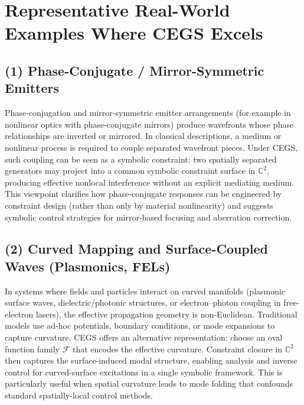 \documentclass[11pt]{article}
\theoremstyle{plain}
\theoremstyle{definition}
\theoremstyle{remark}
\begin{document}
\section*{Representative Real-World Examples Where CEGS Excels}

\subsection*{(1) Phase-Conjugate / Mirror-Symmetric Emitters}
Phase-conjugation and mirror-symmetric emitter arrangements (for example in nonlinear
optics with phase-conjugate mirrors) produce wavefronts whose phase relationships
are inverted or mirrored. In classical descriptions, a medium or nonlinear process
is required to couple separated wavefront pieces. Under CEGS, such coupling can be
seen as a symbolic constraint: two spatially separated generators may project into a
common symbolic constraint surface in \(\mathbb{C}^2\), producing effective
nonlocal interference without an explicit mediating medium. This viewpoint
clarifies how phase-conjugate responses can be engineered by constraint design
(rather than only by material nonlinearity) and suggests symbolic control strategies
for mirror-based focusing and aberration correction.

\subsection*{(2) Curved Mapping and Surface-Coupled Waves (Plasmonics, FELs)}
In systems where fields and particles interact on curved manifolds (plasmonic surface
waves, dielectric/photonic structures, or electron–photon coupling in free-electron
lasers), the effective propagation geometry is non-Euclidean. Traditional models use
ad-hoc potentials, boundary conditions, or mode expansions to capture curvature.
CEGS offers an alternative representation: choose an oval function family \( \mathcal{F} \)
that encodes the effective curvature. Constraint closure in \(\mathbb{C}^2\) then
captures the surface-induced modal structure, enabling analysis and inverse
control for curved-surface excitations in a single symbolic framework. This is
particularly useful when spatial curvature leads to mode folding that confounds
standard spatially-local control methods.
\end{document}

